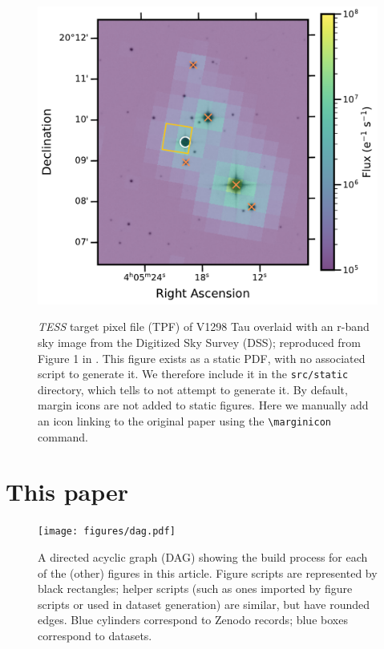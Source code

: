 \documentclass[twocolumn]{aastex631}
\begin{document}
\begin{figure}[ht!]
    \begin{centering}
        \includegraphics[width=\linewidth]{static/TESSaperture.pdf}
        \caption{
            \emph{TESS} target pixel file (TPF) of V1298 Tau
            overlaid with an r-band sky image from the Digitized Sky Survey (DSS);
            reproduced from Figure 1 in \citet{Feinstein2021}.
            This figure exists as a static PDF, with no associated script to
            generate it.
            We therefore include it in the \texttt{src/static} directory, which tells \showyourwork to not attempt to generate it. 
            By default, margin icons are not added to static figures.
            Here we manually add an icon linking to the original paper using the \texttt{\textbackslash marginicon} command.
        }
        \label{fig:eclipse}
    \end{centering}
\end{figure}

\section{This paper}

\begin{figure}[p!]
    \begin{centering}
        \texttt{[image: figures/dag.pdf]}
        \caption{
            A directed acyclic graph (DAG) showing the build process for each of the (other) figures in this article. 
            Figure scripts are represented by black rectangles; helper scripts (such as ones imported by figure scripts or used in dataset generation) are similar, but have rounded edges.
            Blue cylinders correspond to Zenodo records; blue boxes correspond to datasets.
        }
        \label{fig*:dag}
    \end{centering}
\end{figure}
\end{document}
